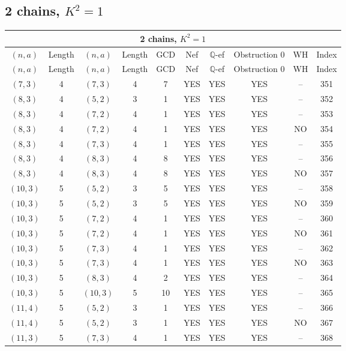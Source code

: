 \subsection{2 chains, $K^2 = 1$}
\begin{longtable}{|c|c|c|c|c|c|c|c|c|c|}
\hline
\multicolumn{10}{|c|}{2 chains, $K^2 = 1$}\\
\hline
$(n,a)$ & Length & $(n,a)$ & Length & GCD & Nef & $\mathbb Q$-ef & Obstruction 0 & WH & Index\\
\hline
\endfirsthead

\hline
$(n,a)$ & Length & $(n,a)$ & Length & GCD & Nef & $\mathbb Q$-ef & Obstruction 0 & WH & Index\\
\hline
\endhead
\hline
\endfoot

$(7, 3)$ & 4 & $(7, 3)$ & 4 & 7 & YES & YES & YES & -- & 351\\
$(8, 3)$ & 4 & $(5, 2)$ & 3 & 1 & YES & YES & YES & -- & 352\\
$(8, 3)$ & 4 & $(7, 2)$ & 4 & 1 & YES & YES & YES & -- & 353\\
$(8, 3)$ & 4 & $(7, 2)$ & 4 & 1 & YES & YES & YES & NO & 354\\
$(8, 3)$ & 4 & $(7, 3)$ & 4 & 1 & YES & YES & YES & -- & 355\\
$(8, 3)$ & 4 & $(8, 3)$ & 4 & 8 & YES & YES & YES & -- & 356\\
$(8, 3)$ & 4 & $(8, 3)$ & 4 & 8 & YES & YES & YES & NO & 357\\
$(10, 3)$ & 5 & $(5, 2)$ & 3 & 5 & YES & YES & YES & -- & 358\\
$(10, 3)$ & 5 & $(5, 2)$ & 3 & 5 & YES & YES & YES & NO & 359\\
$(10, 3)$ & 5 & $(7, 2)$ & 4 & 1 & YES & YES & YES & -- & 360\\
$(10, 3)$ & 5 & $(7, 2)$ & 4 & 1 & YES & YES & YES & NO & 361\\
$(10, 3)$ & 5 & $(7, 3)$ & 4 & 1 & YES & YES & YES & -- & 362\\
$(10, 3)$ & 5 & $(7, 3)$ & 4 & 1 & YES & YES & YES & NO & 363\\
$(10, 3)$ & 5 & $(8, 3)$ & 4 & 2 & YES & YES & YES & -- & 364\\
$(10, 3)$ & 5 & $(10, 3)$ & 5 & 10 & YES & YES & YES & -- & 365\\
$(11, 4)$ & 5 & $(5, 2)$ & 3 & 1 & YES & YES & YES & -- & 366\\
$(11, 4)$ & 5 & $(5, 2)$ & 3 & 1 & YES & YES & YES & NO & 367\\
$(11, 3)$ & 5 & $(7, 3)$ & 4 & 1 & YES & YES & YES & -- & 368\\

\end{longtable}
